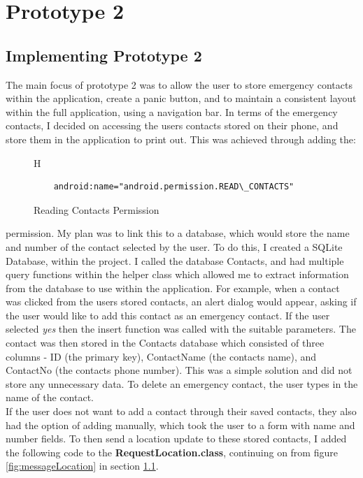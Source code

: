 \documentclass[a4paper]{report}
\begin{document}
\section{Prototype 2}
\label{sec:Prototype2}
\subsection{Implementing Prototype 2}
\label{sec:ImpPrototype2}
The main focus of prototype 2 was to allow the user to store emergency contacts within the application, create a panic button, and to maintain a consistent layout within the full application, using a navigation bar. In terms of the emergency contacts, I decided on accessing the users contacts stored on their phone, and store them in the application to print out. This was achieved through adding the: \\
\begin{figure}{H}
	\singlespacing
\begin{lstlisting}
	android:name="android.permission.READ\_CONTACTS"
\end{lstlisting}
\caption{Reading Contacts Permission}
\label{fig:readContacts}
\end{figure}
 permission. My plan was to link this to a database, which would store the name and number of the contact selected by the user. To do this, I created a SQLite Database, within the project. I called the database Contacts, and had multiple query functions within the helper class which allowed me to extract information from the database to use within the application. For example, when a contact was clicked from the users stored contacts, an alert dialog would appear, asking if the user would like to add this contact as an emergency contact. If the user selected \textit{yes} then the insert function was called with the suitable parameters. The contact was then stored in the Contacts database which consisted of three columns - ID (the primary key), ContactName (the contacts name), and ContactNo (the contacts phone number). This was a simple solution and did not store any unnecessary data. To delete an emergency contact, the user types in the name of the contact. 
\\If the user does not want to add a contact through their saved contacts, they also had the option of adding manually, which took the user to a form with name and number fields. To then send a location update to these stored contacts, I added the following code to the \textbf{RequestLocation.class}, continuing on from figure \ref{fig:messageLocation} in section \ref{sec:ImpPrototype2}.\\ 
\end{document}
